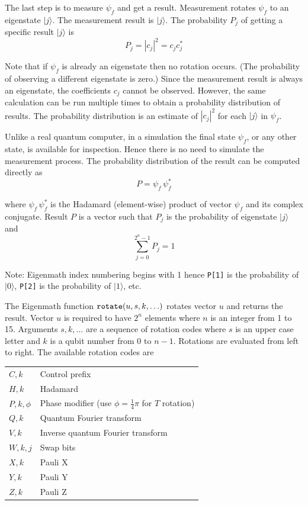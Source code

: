 \documentclass[12pt]{article}
\begin{document}
The last step is to measure $\psi_f$ and get a result.
Measurement rotates $\psi_f$ to an eigenstate $|j\rangle$.
The measurement result is $|j\rangle$.
The probability $P_j$ of getting a specific result $|j\rangle$ is
\begin{equation*}
P_j=|c_j|^2=c_jc_j^*
\end{equation*}

Note that if $\psi_f$ is already an eigenstate then no rotation occurs.
(The probability of observing a different eigenstate is zero.)
Since the measurement result is always an eigenstate,
the coefficients $c_j$ cannot be observed.
However, the same calculation can be run multiple times
to obtain a probability distribution of results.
The probability distribution is an estimate
of $|c_j|^2$ for each $|j\rangle$ in $\psi_f$.

\bigskip
Unlike a real quantum computer, in a simulation
the final state $\psi_f$, or any other state, is available for inspection.
Hence there is no need to simulate the measurement process.
The probability distribution of the result can be computed directly as
\begin{equation*}
P=\psi_f\,\psi_f^*
\end{equation*}

where $\psi_f\,\psi_f^*$
is the Hadamard (element-wise) product of vector $\psi_f$ and its complex conjugate.
Result $P$ is a vector such that $P_j$ is the
probability of eigenstate $|j\rangle$ and
\begin{equation*}
\sum_{j=0}^{2^n-1} P_j=1
\end{equation*}

Note: Eigenmath index numbering begins with 1 hence
\verb$P[1]$ is the probability of $|0\rangle$,
\verb$P[2]$ is the probability of $|1\rangle$, etc.

\bigskip
The Eigenmath function
$\text{\tt rotate}(u,s,k,\ldots)$
rotates vector $u$ and returns the result.
Vector $u$ is required to have $2^n$ elements where $n$ is an
integer from 1 to 15.
Arguments $s,k,\ldots$ are a sequence of rotation codes
where $s$ is an upper case letter and $k$ is a qubit number
from 0 to $n-1$.
Rotations are evaluated from left to right.
The available rotation codes are

\begin{center}
\begin{tabular}{ll}
$C,k$ & Control prefix
\\
$H,k$ & Hadamard
\\
$P,k,\phi$ & Phase modifier (use $\phi=\tfrac{1}{4}\pi$ for $T$ rotation)
\\
$Q,k$ & Quantum Fourier transform
\\
$V,k$ & Inverse quantum Fourier transform
\\
$W,k,j$ & Swap bits
\\
$X,k$ & Pauli X
\\
$Y,k$ & Pauli Y
\\
$Z,k$ & Pauli Z
\end{tabular}
\end{center}
\end{document}
